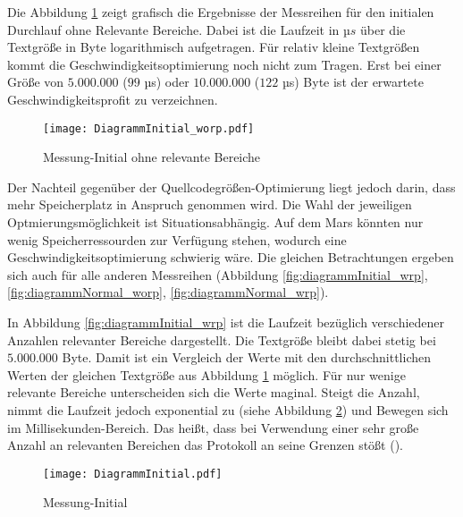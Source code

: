 Die Abbildung \ref{fig:diagrammInitial_worp} zeigt grafisch die Ergebnisse der
Messreihen für den initialen Durchlauf ohne Relevante Bereiche. Dabei ist die
Laufzeit in $µs$ über die Textgröße in Byte logarithmisch aufgetragen. Für
relativ kleine Textgrößen kommt die Geschwindigkeitsoptimierung noch nicht zum
Tragen. Erst bei einer Größe von $5.000.000$ ($99$ µs) oder $10.000.000$ ($122$
µs) Byte ist der erwartete Geschwindigkeitsprofit zu verzeichnen. 

\begin{figure}[H]
	\centering
	\texttt{[image: DiagrammInitial\_worp.pdf]}
	\label{fig:diagrammInitial_worp}
	\caption{Messung-Initial ohne relevante Bereiche}
\end{figure}

Der Nachteil gegenüber der Quellcodegrößen-Optimierung liegt jedoch darin, dass
mehr Speicherplatz in Anspruch genommen wird. Die Wahl der jeweiligen
Optmierungsmöglichkeit ist Situationsabhängig. Auf dem Mars könnten nur wenig
Speicherressourden zur Verfügung stehen, wodurch eine
Geschwindigkeitsoptimierung schwierig wäre. Die gleichen Betrachtungen ergeben
sich auch für alle anderen Messreihen (Abbildung \ref{fig:diagrammInitial_wrp},
\ref{fig:diagrammNormal_worp}, \ref{fig:diagrammNormal_wrp}). 

In Abbildung \ref{fig:diagrammInitial_wrp} ist die Laufzeit bezüglich
verschiedener Anzahlen relevanter Bereiche dargestellt. Die Textgröße bleibt
dabei stetig bei $5.000.000$ Byte. Damit ist ein Vergleich der Werte mit den
durchschnittlichen Werten der gleichen Textgröße aus Abbildung
\ref{fig:diagrammInitial_worp} möglich. Für nur wenige relevante Bereiche
unterscheiden sich die Werte maginal. Steigt die Anzahl, nimmt die Laufzeit
jedoch exponential zu (siehe Abbildung \ref{fig:diagrammInitial}) und Bewegen
sich im Millisekunden-Bereich. Das heißt, dass bei Verwendung einer sehr große
Anzahl an relevanten Bereichen das Protokoll an seine Grenzen stößt
().

\begin{figure}[H]
	\centering
	\texttt{[image: DiagrammInitial.pdf]}
	\label{fig:diagrammInitial}
	\caption{Messung-Initial}
\end{figure}

